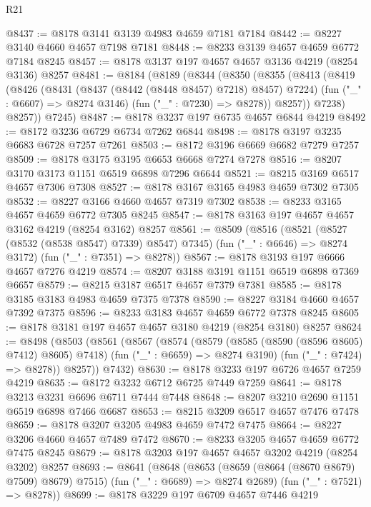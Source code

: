 \begin{lexlean}{R21}
\begin{coremodule}
@8437 := @8178 @3141 @3139 @4983 @4659 @7181 @7184
@8442 := @8227 @3140 @4660 @4657 @7198 @7181
@8448 := @8233 @3139 @4657 @4659 @6772 @7184 @8245
@8457 := @8178 @3137 @197 @4657 @4657 @3136 @4219 (@8254 @3136) @8257
@8481 := @8184
    (@8189
      (@8344
        (@8350
          (@8355
            (@8413
              (@8419
                (@8426
                  (@8431 (@8437 (@8442 (@8448 @8457) @7218) @8457) @7224)
                  (fun ("_" : @6607) => @8274 @3146)
                  (fun ("_" : @7230) => @8278))
                @8257))
            @7238)
          @8257))
      @7245)
@8487 := @8178 @3237 @197 @6735 @4657 @6844 @4219
@8492 := @8172 @3236 @6729 @6734 @7262 @6844
@8498 := @8178 @3197 @3235 @6683 @6728 @7257 @7261
@8503 := @8172 @3196 @6669 @6682 @7279 @7257
@8509 := @8178 @3175 @3195 @6653 @6668 @7274 @7278
@8516 := @8207 @3170 @3173 @1151 @6519 @6898 @7296 @6644
@8521 := @8215 @3169 @6517 @4657 @7306 @7308
@8527 := @8178 @3167 @3165 @4983 @4659 @7302 @7305
@8532 := @8227 @3166 @4660 @4657 @7319 @7302
@8538 := @8233 @3165 @4657 @4659 @6772 @7305 @8245
@8547 := @8178 @3163 @197 @4657 @4657 @3162 @4219 (@8254 @3162) @8257
@8561 := @8509
    (@8516
      (@8521 (@8527 (@8532 (@8538 @8547) @7339) @8547) @7345)
      (fun ("_" : @6646) => @8274 @3172)
      (fun ("_" : @7351) => @8278))
@8567 := @8178 @3193 @197 @6666 @4657 @7276 @4219
@8574 := @8207 @3188 @3191 @1151 @6519 @6898 @7369 @6657
@8579 := @8215 @3187 @6517 @4657 @7379 @7381
@8585 := @8178 @3185 @3183 @4983 @4659 @7375 @7378
@8590 := @8227 @3184 @4660 @4657 @7392 @7375
@8596 := @8233 @3183 @4657 @4659 @6772 @7378 @8245
@8605 := @8178 @3181 @197 @4657 @4657 @3180 @4219 (@8254 @3180) @8257
@8624 := @8498
    (@8503
      (@8561
        (@8567
          (@8574
            (@8579 (@8585 (@8590 (@8596 @8605) @7412) @8605) @7418)
            (fun ("_" : @6659) => @8274 @3190)
            (fun ("_" : @7424) => @8278))
          @8257))
      @7432)
@8630 := @8178 @3233 @197 @6726 @4657 @7259 @4219
@8635 := @8172 @3232 @6712 @6725 @7449 @7259
@8641 := @8178 @3213 @3231 @6696 @6711 @7444 @7448
@8648 := @8207 @3210 @2690 @1151 @6519 @6898 @7466 @6687
@8653 := @8215 @3209 @6517 @4657 @7476 @7478
@8659 := @8178 @3207 @3205 @4983 @4659 @7472 @7475
@8664 := @8227 @3206 @4660 @4657 @7489 @7472
@8670 := @8233 @3205 @4657 @4659 @6772 @7475 @8245
@8679 := @8178 @3203 @197 @4657 @4657 @3202 @4219 (@8254 @3202) @8257
@8693 := @8641
    (@8648
      (@8653 (@8659 (@8664 (@8670 @8679) @7509) @8679) @7515)
      (fun ("_" : @6689) => @8274 @2689)
      (fun ("_" : @7521) => @8278))
@8699 := @8178 @3229 @197 @6709 @4657 @7446 @4219

\end{coremodule}
\end{lexlean}
